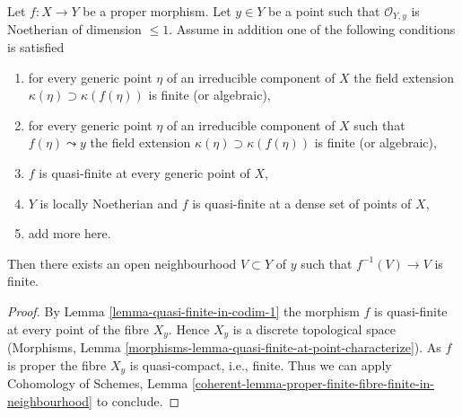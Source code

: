 \begin{lemma}
\label{lemma-finite-in-codim-1}
Let $f : X \to Y$ be a proper morphism. Let $y \in Y$ be a point
such that $\mathcal{O}_{Y, y}$ is Noetherian of dimension $\leq 1$.
Assume in addition one of the following conditions is satisfied
\begin{enumerate}
\item for every generic point $\eta$ of an irreducible component
of $X$ the field extension $\kappa(\eta) \supset \kappa(f(\eta))$
is finite (or algebraic),
\item for every generic point $\eta$ of an irreducible component
of $X$ such that $f(\eta) \leadsto y$ the field extension
$\kappa(\eta) \supset \kappa(f(\eta))$ is finite (or algebraic),
\item $f$ is quasi-finite at every generic point of $X$,
\item $Y$ is locally Noetherian and $f$
is quasi-finite at a dense set of points of $X$,
\item add more here.
\end{enumerate}
Then there exists an open neighbourhood $V \subset Y$ of $y$ such that
$f^{-1}(V) \to V$ is finite.
\end{lemma}

\begin{proof}
By Lemma \ref{lemma-quasi-finite-in-codim-1} the morphism $f$ is
quasi-finite at every point of the fibre $X_y$. Hence
$X_y$ is a discrete topological space
(Morphisms, Lemma \ref{morphisms-lemma-quasi-finite-at-point-characterize}).
As $f$ is proper the fibre $X_y$ is quasi-compact, i.e., finite.
Thus we can apply Cohomology of Schemes, Lemma
\ref{coherent-lemma-proper-finite-fibre-finite-in-neighbourhood}
to conclude.
\end{proof}










